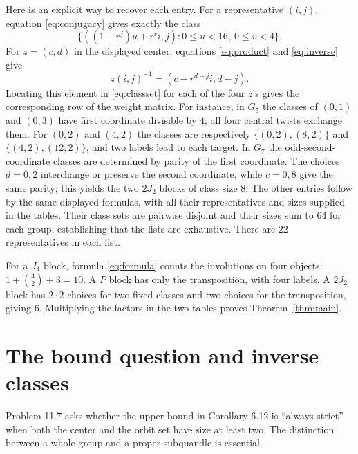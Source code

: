 \documentclass[11pt]{article}
\begin{document}
Here is an explicit way to recover each entry. For a representative
$(i,j)$, equation \eqref{eq:conjugacy} gives exactly the class
\begin{equation}\label{eq:classset}
 \{((1-r^j)u+r^v i,j):0\leq u<16,\ 0\leq v<4\}.
\end{equation}
For $z=(c,d)$ in the displayed center, equations \eqref{eq:product}
and \eqref{eq:inverse} give
\begin{equation}\label{eq:twist}
 z(i,j)^{-1}=(c-r^{d-j}i,d-j).
\end{equation}
Locating this element in \eqref{eq:classset} for each of the four $z$'s
gives the corresponding row of the weight matrix.
For instance, in $G_5$ the classes of $(0,1)$ and $(0,3)$ have first
coordinate divisible by $4$; all four central twists exchange them.
For $(0,2)$ and $(4,2)$ the classes are respectively
$\{(0,2),(8,2)\}$ and $\{(4,2),(12,2)\}$, and two labels lead to
each target. In $G_7$ the odd-second-coordinate classes are determined
by parity of the first coordinate. The choices $d=0,2$ interchange or
preserve the second coordinate, while $c=0,8$ give the same parity;
this yields the two $2J_2$ blocks of class size $8$.
The other entries follow by the same displayed formulas, with all their
representatives and sizes supplied in the tables. Their class sets are
pairwise disjoint and their sizes sum to $64$ for each group, establishing
that the lists are exhaustive. There are $22$ representatives in each list.

For a $J_4$ block, formula \eqref{eq:formula} counts the involutions on
four objects: $1+\binom42+3=10$. A $P$ block has only the transposition,
with four labels. A $2J_2$ block has $2\cdot2$ choices for two fixed
classes and two choices for the transposition, giving $6$.
Multiplying the factors in the two tables proves Theorem~\ref{thm:main}.

\section{The bound question and inverse classes}
Problem 11.7 \cite[Section 11, p.~27]{Ta} asks whether the upper
bound in Corollary 6.12 is ``always strict'' when both the center
and the orbit set have size at least two. The distinction between
a whole group and a proper subquandle is essential.
\end{document}
